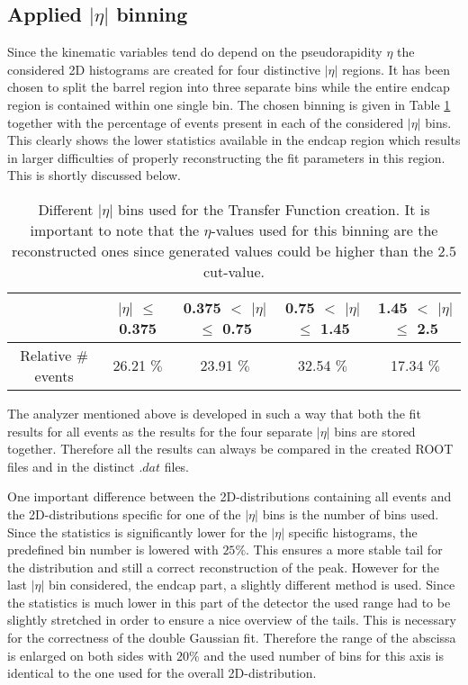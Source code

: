\subsection{Applied $\vert \eta \vert$ binning}
Since the kinematic variables tend do depend on the pseudorapidity $\eta$ the considered 2D histograms are created for four distinctive $\vert \eta \vert$ regions. It has been chosen to split the barrel region into three separate bins while the entire endcap region is contained within one single bin. The chosen binning is given in Table \ref{table::EtaBins} together with the percentage of events present in each of the considered $\vert \eta \vert$ bins. This clearly shows the lower statistics available in the endcap region which results in larger difficulties of properly reconstructing the fit parameters in this region. This is shortly discussed below.
\begin{table}[h!]
 \centering
 \begin{tabular}{|c|c|c|c|c|}
  \hline
			 & $\vert\eta\vert$ $\leq$ 0.375	& 0.375 $<$ $\vert\eta\vert$ $\leq$ 0.75	& 0.75 $<$ $\vert\eta\vert$ $\leq$ 1.45	& 1.45 $<$ $\vert\eta\vert$ $\leq$ 2.5	\\
  \hline
    Relative $\#$ events &  26.21 $\%$				& 23.91 $\%$					&	32.54 $\%$			& 	17.34 $\%$			\\
  \hline
 \end{tabular} 
 \caption{Different $\vert\eta\vert$ bins used for the Transfer Function creation. It is important to note that the $\eta$-values used for this binning are the reconstructed ones since generated values could be higher than the $2.5$ cut-value.} \label{table::EtaBins}
\end{table}

The analyzer mentioned above is developed in such a way that both the fit results for all events as the results for the four separate $\vert \eta \vert$ bins are stored together. Therefore all the results can always be compared in the created ROOT files and in the distinct $.dat$ files.

One important difference between the 2D-distributions containing all events and the 2D-distributions specific for one of the $\vert \eta \vert$ bins is the number of bins used. Since the statistics is significantly lower for the $\vert \eta \vert$ specific histograms, the predefined bin number is lowered with $25 \%$. This ensures a more stable tail for the distribution and still a correct reconstruction of the peak.
However for the last $\vert \eta \vert$ bin considered, the endcap part, a slightly different method is used. Since the statistics is much lower in this part of the detector the used range had to be slightly stretched in order to ensure a nice overview of the tails. This is necessary for the correctness of the double Gaussian fit. Therefore the range of the abscissa is enlarged on both sides with $20 \%$ and the used number of bins for this axis is identical to the one used for the overall 2D-distribution.

